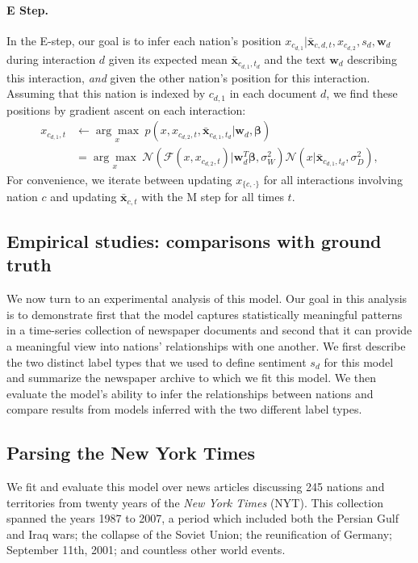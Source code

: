 \paragraph{E Step.} In the E-step, our goal is to infer each nation's
position $x_{c_{d,1}} | \bm \bar{x}_{c,d,t}, x_{c_{d,2}}, s_d, \bm
w_d$ during interaction $d$ given its expected mean $\bm \bar
x_{c_{d,1},t_d}$ and the text $\bm w_d$ describing this interaction,
\emph{and} given the other nation's position for this interaction.
Assuming that this nation is indexed by $c_{d,1}$ in each document $d$, we
find these positions by gradient ascent on each interaction:
\begin{align}
  x_{c_{d, 1}, t} & \gets \underset{ x }
  {\arg \max}\hspace{3pt}
  p(x, x_{c_{d,2},t}, \bm \bar x_{c_{d,1},t_d} | \bm w_d, \bm \beta) \nonumber \\
  & = \underset{x}
  { \arg \max }\hspace{3pt}
  \mathcal{N}( \mathcal{F}(x, x_{c_{d,2},t}) | \bm w_d^T \bm \beta,
  \sigma_W^2 )
  \mathcal{N}( x | \bm \bar x_{c_{d,1},t_d}, \sigma_D^2 ),
\end{align}
For convenience, we iterate between updating $x_{\{c,\cdot\}}$ for all
interactions involving nation $c$ and updating $\bm \bar x_{c,t}$
with the M step for all times $t$.

\subsection{Empirical studies: comparisons with ground truth}
We now turn to an experimental analysis of this model.  Our goal in
this analysis is to demonstrate first that the model captures
statistically meaningful patterns in a time-series collection of
newspaper documents and second that it can provide a meaningful view
into nations' relationships with one another. We first describe the
two distinct label types that we used to define sentiment $s_d$ for
this model and summarize the newspaper archive to which we fit this
model.  We then evaluate the model's ability to infer the
relationships between nations and compare results from models
inferred with the two different label types.

\subsection*{Parsing the New York Times}

We fit and evaluate this model over news articles discussing 245
nations and territories from twenty years of the \emph{New York Times}
(NYT).  This collection spanned the years 1987 to 2007, a period which
included both the Persian Gulf and Iraq wars; the collapse of the
Soviet Union; the reunification of Germany; September 11th, 2001; and
countless other world events.

